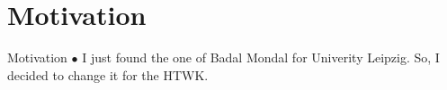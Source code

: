 \section{Motivation}
\begin{frame}{Motivation}
$\bullet$ I just found the one of Badal Mondal for Univerity Leipzig. So, I decided to change it for the HTWK. 
\end{frame}